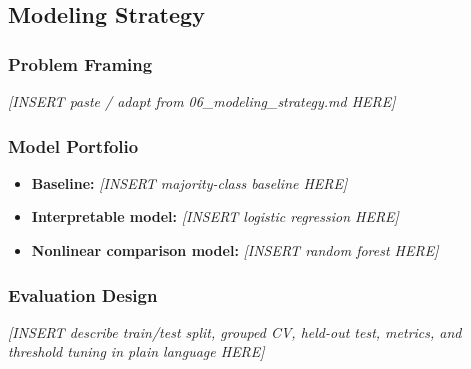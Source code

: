 \documentclass[12pt]{article}
\newcommand{\placeholder}[1]{\textit{[INSERT #1 HERE]}}
\begin{document}
\subsection{Modeling Strategy}
\label{subsec:modeling_strategy}

%
%

\subsubsection*{Problem Framing}
\placeholder{paste / adapt from 06\_modeling\_strategy.md}

\subsubsection*{Model Portfolio}
\begin{itemize}[leftmargin=1.5em]
    \item \textbf{Baseline:} \placeholder{majority-class baseline}
    \item \textbf{Interpretable model:} \placeholder{logistic regression}
    \item \textbf{Nonlinear comparison model:} \placeholder{random forest}
\end{itemize}

\subsubsection*{Evaluation Design}
\placeholder{describe train/test split, grouped CV, held-out test, metrics, and threshold tuning in plain language}
\end{document}
